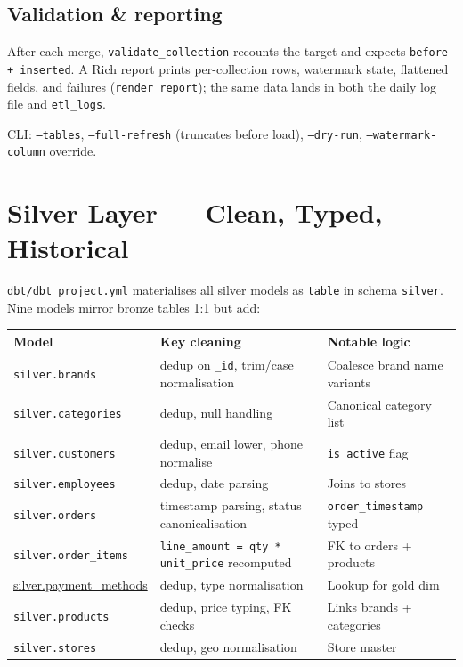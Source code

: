\documentclass[11pt,a4paper]{article}
\begin{document}
\subsection{Validation \& reporting}
After each merge, \texttt{validate\_collection} recounts the target and expects \texttt{before + inserted}. A Rich report prints per-collection rows, watermark state, flattened fields, and failures (\texttt{render\_report}); the same data lands in both the daily log file and \texttt{etl\_logs}.

CLI: \texttt{--tables}, \texttt{--full-refresh} (truncates before load), \texttt{--dry-run}, \texttt{--watermark-column} override.

\section{Silver Layer — Clean, Typed, Historical}

\texttt{dbt/dbt\_project.yml} materialises all silver models as \texttt{table} in schema \texttt{silver}. Nine models mirror bronze tables 1:1 but add:

\begin{center}
\begin{longtable}{>{\raggedright\arraybackslash}p{3.8cm} >{\raggedright\arraybackslash}p{4.6cm} >{\raggedright\arraybackslash}p{6.4cm}}
\toprule
Model & Key cleaning & Notable logic \\
\midrule
\endhead
\texttt{silver.brands} & dedup on \texttt{\_id}, trim/case normalisation & Coalesce brand name variants \\
\texttt{silver.categories} & dedup, null handling & Canonical category list \\
\texttt{silver.customers} & dedup, email lower, phone normalise & \texttt{is\_active} flag \\
\texttt{silver.employees} & dedup, date parsing & Joins to stores \\
\texttt{silver.orders} & timestamp parsing, status canonicalisation & \texttt{order\_timestamp} typed \\
\texttt{silver.order\_items} & \texttt{line\_amount = qty * unit\_price} recomputed & FK to orders + products \\
\url{silver.payment_methods} & dedup, type normalisation & Lookup for gold dim \\
\texttt{silver.products} & dedup, price typing, FK checks & Links brands + categories \\
\texttt{silver.stores} & dedup, geo normalisation & Store master \\
\bottomrule
\end{longtable}
\end{center}
\end{document}
